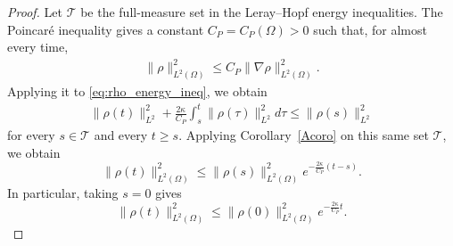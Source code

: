 \documentclass[11pt,reqno]{amsart}
\theoremstyle{plain}
\numberwithin{equation}{section}
\begin{document}
\begin{proof}
Let $\mathcal T$ be the full-measure set in the Leray--Hopf energy inequalities. The Poincar\'e inequality gives a constant $C_P=C_P(\Omega)>0$ such that, for almost every time,
\begin{equation}
    \begin{split}
        \|\rho\|^2_{L^2(\Omega)}\le C_P\|\nabla\rho\|^2_{L^2(\Omega)}.
    \end{split}
\end{equation} 
Applying it to \eqref{eq:rho_energy_ineq}, we obtain 
\begin{equation}
   \begin{split}
      \|\rho(t)\|^2_{L^2}+\frac{2\kappa}{C_P}\int_s^t\|\rho(\tau)\|^2_{L^2}d\tau\le \|\rho(s)\|^2_{L^2}
   \end{split}
\end{equation}
for every $s\in\mathcal T$ and every $t\ge s$. 
Applying Corollary~\ref{Acoro} on this same set $\mathcal T$, we obtain
\begin{equation}\label{rho1}
    \|\rho(t)\|^2_{L^2(\Omega)}\le\|\rho(s)\|^2_{L^2(\Omega)}e^{-\frac{2\kappa}{C_P}(t-s)}.
\end{equation}
In particular, taking $s=0$ gives
\begin{equation}\label{rho2}
    \|\rho(t)\|^2_{L^2(\Omega)}\le\|\rho(0)\|^2_{L^2(\Omega)}e^{-\frac{2\kappa}{C_P}t}.
\end{equation}


\end{proof}
\end{document}
